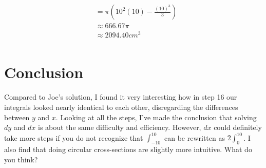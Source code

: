 \documentclass[letterpaper, 12pt]{article}
\begin{document}
\begin{align}
                                  & =\pi\left(10^{2}\left(10\right)-\frac{\left(10\right)^{3}}{3}\right)                                                                \\
                                  & \approx 666.67\pi                                                                                                                   \\
                                  & \approx \boxed{2094.40cm^3}                                                                                                         \\
\end{align}
\section{Conclusion}
Compared to Joe's solution, I found it very interesting how in step 16 our integrals looked nearly identical to each other, disregarding the differences between $y$ and $x$. Looking at all the steps, I've made the conclusion that solving $dy$ and $dx$ is about the same difficulty and efficiency. However, $dx$ could definitely take more steps if you do not recognize that $\int_{-10}^{10}$ can be rewritten as $2\int_{0}^{10}$. I also find that doing circular cross-sections are slightly more intuitive. What do you think?
\end{document}
